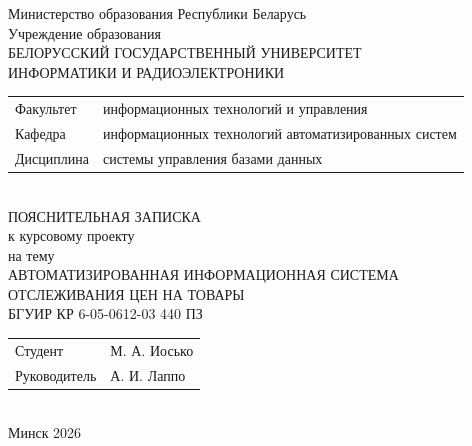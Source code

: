 \begin{titlepage}
  \begin{center}
    Министерство образования Республики Беларусь\\[1em]
    Учреждение образования\\
    БЕЛОРУССКИЙ ГОСУДАРСТВЕННЫЙ УНИВЕРСИТЕТ \\
    ИНФОРМАТИКИ И РАДИОЭЛЕКТРОНИКИ\\[1em]

    \begin{minipage}{\textwidth}
      \begin{flushleft}
        \begin{tabular}{ l l }
          Факультет & информационных технологий и управления\\
          Кафедра & информационных технологий автоматизированных систем\\
          Дисциплина & системы управления базами данных
        \end{tabular}
      \end{flushleft}
    \end{minipage}\\[1em]

    \vfill
    {ПОЯСНИТЕЛЬНАЯ ЗАПИСКА}\\
    {к курсовому проекту}\\
    {на тему}\\[1em]
    \MakeUppercase{Автоматизированная информационная система отслеживания цен на товары}\\[1em]
    {БГУИР  КР 6-05-0612-03 440 ПЗ}\\
        \vfill
    \begin{tabular}{ p{}p{} }
      Студент & М. А. Иосько \\
      Руководитель & А. И. Лаппо \\
    \end{tabular}
    \textbf{\large \MakeUppercase {}}\\[5em]
    {\normalsize Минск 2026}
  \end{center}
\end{titlepage}
